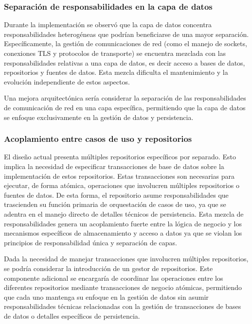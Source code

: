 \subsubsection{Separación de responsabilidades en la capa de datos}

Durante la implementación se observó que la capa de datos concentra responsabilidades heterogéneas que podrían beneficiarse de una mayor separación. Específicamente, la gestión de comunicaciones de red (como el manejo de sockets, conexiones TLS y protocolos de transporte) se encuentra mezclada con las responsabilidades relativas a una capa de datos, es decir acceso a bases de datos, repositorios y fuentes de datos. Esta mezcla dificulta el mantenimiento y la evolución independiente de estos aspectos.

Una mejora arquitectónica sería considerar la separación de las responsabilidades de comunicación de red en una capa específica, permitiendo que la capa de datos se enfoque exclusivamente en la gestión de datos y persistencia.

\subsubsection{Acoplamiento entre casos de uso y repositorios}

El diseño actual presenta múltiples repositorios específicos por separado. Esto implica la necesidad de especificar transacciones de base de datos sobre la implementación de estos repositorios. Estas transacciones son necesarias para ejecutar, de forma atómica, operaciones que involucren múltiples repositorios o fuentes de datos. De esta forma, el repositorio asume responsabilidades que trascienden su función primaria de orquestación de casos de uso, ya que se adentra en el manejo directo de detalles técnicos de persistencia. Esta mezcla de responsabilidades genera un acoplamiento fuerte entre la lógica de negocio y los mecanismos específicos de almacenamiento y acceso a datos ya que se violan los principios de responsabilidad única y separación de capas.

Dada la necesidad de manejar transacciones que involucren múltiples repositorios, se podría considerar la introducción de un gestor de repositorios. Este componente adicional se encargaría de coordinar las operaciones entre los diferentes repositorios mediante transacciones de negocio atómicas, permitiendo que cada uno mantenga su enfoque en la gestión de datos sin asumir responsabilidades técnicas relacionadas con la gestión de transacciones de bases de datos o detalles específicos de persistencia.

